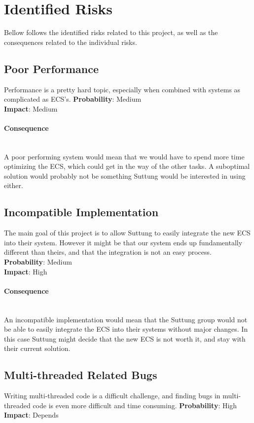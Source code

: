 \newcommand{\ptparagraph}[1]{\paragraph{#1}\mbox{}\\}
\newcommand{\ptsubparagraph}[1]{\mbox{}\\\textbf{#1}\mbox{}\\}

\section*{Identified Risks}
Bellow follows the identified risks related to this project, 
as well as the consequences related to the individual risks.

\subsection*{Poor Performance}
Performance is a pretty hard topic, especially when combined with
systems as complicated as ECS's.
\textbf{Probability}: Medium\\
\textbf{Impact}: Medium

\ptparagraph{Consequence}
A poor performing system would mean that we would have to spend more time
optimizing the ECS, which could get in the way of the other tasks.
A suboptimal solution would probably not be something Suttung would be interested
in using either.

\subsection*{Incompatible Implementation}
The main goal of this project is to allow Suttung to easily integrate the new ECS
into their system. 
However it might be that our system ends up fundamentally different than theirs,
and that the integration is not an easy process.
\textbf{Probability}: Medium\\
\textbf{Impact}: High

\ptparagraph{Consequence} 
An incompatible implementation would mean that the Suttung group would not be able to
easily integrate the ECS into their systems without major changes. 
In this case Suttung might decide that the new ECS is not worth it,
and stay with their current solution.

\subsection*{Multi-threaded Related Bugs}
Writing multi-threaded code is a difficult challenge, and finding bugs in multi-threaded
code is even more difficult and time consuming.
\textbf{Probability}: High\\
\textbf{Impact}: Depends

